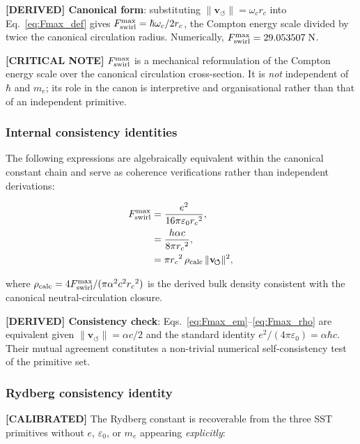 \documentclass[11pt]{article}
\theoremstyle{definition}
\theoremstyle{plain}
\theoremstyle{remark}
\newcommand{\rc}{{r_c}}
\newcommand{\vnorm}{\lVert \mathbf{v}_{\!\boldsymbol{\circlearrowleft}} \rVert}
\begin{document}
        \textbf{[DERIVED] Canonical form}: substituting $\vnorm = \omega_c \rc$ into Eq.~\eqref{eq:Fmax_def} gives $F_{\rm swirl}^{\max} = \hbar\omega_c/2\rc$, the Compton energy scale divided by twice the canonical circulation radius. Numerically, $F_{\rm swirl}^{\max} = 29.053507\;\text{N}$.

        \textbf{[CRITICAL NOTE]} $F_{\rm swirl}^{\max}$ is a mechanical reformulation of the Compton energy scale over the canonical circulation cross-section. It is \emph{not} independent of $\hbar$ and $m_e$; its role in the canon is interpretive and organisational rather than that of an independent primitive.

        \subsubsection{Internal consistency identities}

        The following expressions are algebraically equivalent within the canonical constant chain and serve as coherence verifications rather than independent derivations:

        \begin{align}
            F_{\rm swirl}^{\max}
            &= \frac{e^2}{16\pi\varepsilon_0 \rc^2},
            \label{eq:Fmax_em}\\
            &= \frac{h\alpha c}{8\pi \rc^2},
            \label{eq:Fmax_hac}\\
            &= \pi \rc^2\,\rho_{\rm calc}\,\vnorm^2,
            \label{eq:Fmax_rho}
        \end{align}

        where $\rho_{\rm calc} = 4F_{\rm swirl}^{\max}/(\pi\alpha^2 c^2 \rc^2)$ is the derived bulk density consistent with the canonical neutral-circulation closure.

        \textbf{[DERIVED] Consistency check}: Eqs.~\eqref{eq:Fmax_em}--\eqref{eq:Fmax_rho} are equivalent given $\vnorm = \alpha c/2$ and the standard identity $e^2/(4\pi\varepsilon_0) = \alpha\hbar c$. Their mutual agreement constitutes a non-trivial numerical self-consistency test of the primitive set.

        \subsubsection{Rydberg consistency identity}

        \textbf{[CALIBRATED]} The Rydberg constant is recoverable from the three SST primitives without $e$, $\varepsilon_0$, or $m_e$ appearing \emph{explicitly}:
\end{document}

